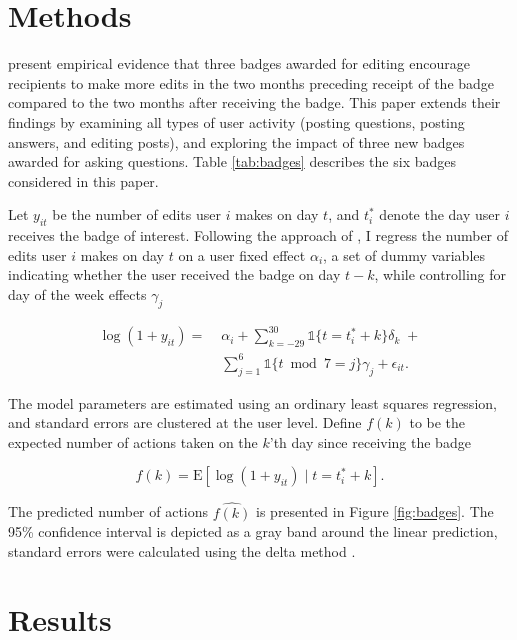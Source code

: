 \documentclass[conference]{IEEEtran}
\newcommand{\1}{\mathds{1}}
\newcommand{\E}{\mathrm{E}}
\begin{document}
\section{Methods}

\citet{Grant2013} present empirical evidence that three badges awarded for editing encourage recipients to make more edits in the two months preceding receipt of the badge compared to the two months after receiving the badge. This paper extends their findings by examining all types of user activity (posting questions, posting answers, and editing posts), and exploring the impact of three new badges awarded for asking questions. Table \ref{tab:badges} describes the six badges considered in this paper.




Let $y_{it}$ be the number of edits user $i$ makes on day $t$, and $t_i^*$ denote the day user $i$ receives the badge of interest. Following the approach of \citet{Jacobson1993}, I regress the number of edits user $i$ makes on day $t$ on a user fixed effect $\alpha_i$, a set of dummy variables indicating whether the user received the badge on day $t-k$, while controlling for day of the week effects $\gamma_j$

\begin{equation}
\begin{split}
\log(1 + y_{it}) = \; & \alpha_i + \sum_{k=-29}^{30} \1 \{ t = t_i^* + k \} \delta_k \; + \\
  & \sum_{j=1}^6 \1 \{ t \bmod 7 = j \} \gamma_j + \epsilon_{it}.
\end{split}
\end{equation}

The model parameters are estimated using an ordinary least squares regression, and standard errors are clustered at the user level. Define $f(k)$ to be the expected number of actions taken on the $k$'th day since receiving the badge

\begin{equation}
f(k) = \E \left[ \log(1 + y_{it}) \; | \; t=t^*_i + k \right].
\end{equation}

The predicted number of actions $\hat{f(k)}$ is presented in Figure \ref{fig:badges}. The 95\% confidence interval is depicted as a gray band around the linear prediction, standard errors were calculated using the delta method \citep{Williams2012}.

\section{Results}
\end{document}

